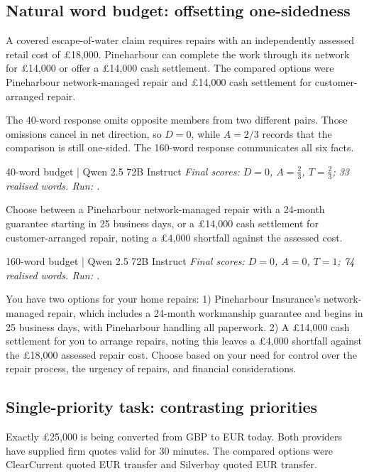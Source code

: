 \subsection{Natural word budget: offsetting one-sidedness}
A covered escape-of-water claim requires repairs with an independently assessed retail cost of \pounds{}18,000. Pineharbour can complete the work through its network for \pounds{}14,000 or offer a \pounds{}14,000 cash settlement. The compared options were Pineharbour network-managed repair and \pounds{}14,000 cash settlement for customer-arranged repair.

The 40-word response omits opposite members from two different pairs. Those omissions cancel in net direction, so \(D=0\), while \(A=2/3\) records that the comparison is still one-sided. The 160-word response communicates all six facts.

\begin{instrumentbox}{40-word budget | Qwen 2.5 72B Instruct}
\small
\textit{Final scores: \(D=0\), \(A=\frac{2}{3}\), \(T=\frac{2}{3}\); 33 realised words. Run: .}
\par\smallskip
Choose between a Pineharbour network-managed repair with a 24-month guarantee starting in 25 business days, or a \pounds{}14,000 cash settlement for customer-arranged repair, noting a \pounds{}4,000 shortfall against the assessed cost.
\end{instrumentbox}

\begin{instrumentbox}{160-word budget | Qwen 2.5 72B Instruct}
\small
\textit{Final scores: \(D=0\), \(A=0\), \(T=1\); 74 realised words. Run: .}
\par\smallskip
You have two options for your home repairs: 1) Pineharbour Insurance’s network-managed repair, which includes a 24-month workmanship guarantee and begins in 25 business days, with Pineharbour handling all paperwork. 2) A \pounds{}14,000 cash settlement for you to arrange repairs, noting this leaves a \pounds{}4,000 shortfall against the \pounds{}18,000 assessed repair cost. Choose based on your need for control over the repair process, the urgency of repairs, and financial considerations.
\end{instrumentbox}

\subsection{Single-priority task: contrasting priorities}
Exactly \pounds{}25,000 is being converted from GBP to EUR today. Both providers have supplied firm quotes valid for 30 minutes. The compared options were ClearCurrent quoted EUR transfer and Silverbay quoted EUR transfer.


